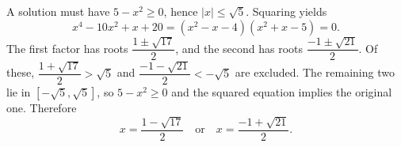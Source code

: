 A solution must have $5-x^2\ge0$, hence $|x|\le\sqrt5$. Squaring yields
\[x^4-10x^2+x+20=(x^2-x-4)(x^2+x-5)=0.\]
The first factor has roots $\dfrac{1\pm\sqrt{17}}{2}$, and the second has roots $\dfrac{-1\pm\sqrt{21}}{2}$. Of these, $\dfrac{1+\sqrt{17}}{2}>\sqrt5$ and $\dfrac{-1-\sqrt{21}}{2}<-\sqrt5$ are excluded. The remaining two lie in $[-\sqrt5,\sqrt5]$, so $5-x^2\ge0$ and the squared equation implies the original one. Therefore
\[\boxed{x=\dfrac{1-\sqrt{17}}{2}\quad\text{or}\quad x=\dfrac{-1+\sqrt{21}}{2}}.\]
